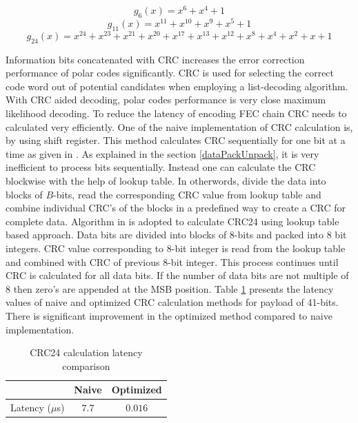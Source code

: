 \begin{equation} \label{crc_polynomial6}
g_{6}(x) = x^{6} + x^{4} + 1
\end{equation}
\begin{equation} \label{crc_polynomial11}
g_{11}(x) = x^{11} + x^{10} + x^{9} + x^{5} + 1
\end{equation}
\begin{equation} \label{crc_polynomial24}
g_{24}(x) = x^{24} + x^{23} + x^{21} + x^{20} + x^{17} + x^{13} + x^{12} + x^{8} + x^{4} + x^{2} + x + 1
\end{equation}

Information bits concatenated with CRC increases the error correction performance of polar codes significantly. CRC is used for selecting the correct code word out of potential candidates when employing a list-decoding algorithm. With CRC aided decoding, polar codes performance is very close maximum likelihood decoding. To reduce the latency of encoding FEC chain CRC needs to calculated very efficiently. One of the naive implementation of CRC calculation is, by using shift register. This method calculates CRC sequentially for one bit at a time as given in \cite{naiveCRCCalculation}. As explained in the section \ref{dataPackUnpack}, it is very inefficient to process bits sequentially. Instead one can calculate the CRC blockwise with the help of lookup table. In otherwords, divide the data into blocks of $B$-bits, read the corresponding CRC value from lookup table and combine individual CRC's of the blocks in a predefined way to create a CRC for complete data. Algorithm in \cite{Sarwate:1988:CCR:63030.63037} is adopted to calculate CRC24 using lookup table based approach. Data bits are divided into blocks of 8-bits and packed into 8 bit integers. CRC value corresponding to 8-bit integer is read from the lookup table and combined with CRC of previous 8-bit integer. This process continues until CRC is calculated for all data bits. If the number of data bits are not multiple of 8 then zero's are appended at the MSB position.  Table \ref{tab:crcLatencyTable} presents the latency values of naive and optimized  CRC calculation methods for payload of 41-bits. There is significant improvement in the optimized method compared to naive implementation.

\begin{table}[h!]
	\begin{center}
		\caption{CRC24 calculation latency comparison}
		\label{tab:crcLatencyTable}
		\begin{tabular}{c|c|c} %
			\textbf{ } & Naive & Optimized \\
			\hline
			Latency ($\mu$s) & $7.7$ & $0.016$\\
		\end{tabular}
	\end{center}
\end{table}

